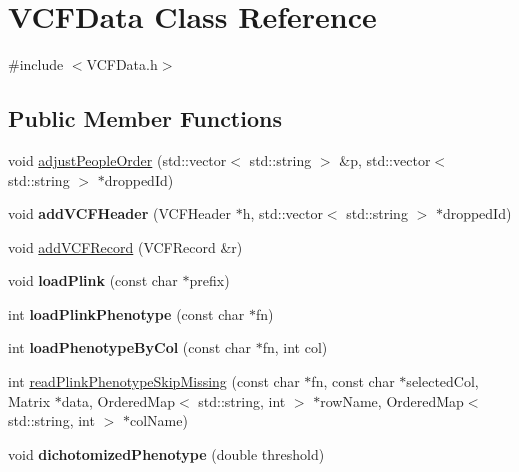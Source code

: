 \hypertarget{classVCFData}{\section{V\-C\-F\-Data Class Reference}
\label{classVCFData}
}


{\ttfamily \#include $<$V\-C\-F\-Data.\-h$>$}

\subsection*{Public Member Functions}
\begin{DoxyCompactItemize}
\item 
void \hyperlink{classVCFData_aa237fc9ab7baada2b1621bd098319c7e}{adjust\-People\-Order} (std\-::vector$<$ std\-::string $>$ \&p, std\-::vector$<$ std\-::string $>$ $\ast$dropped\-Id)
\item 
\hypertarget{classVCFData_a4a54a9919215f4d3ce8e7cafdc8593f4}{void {\bfseries add\-V\-C\-F\-Header} (V\-C\-F\-Header $\ast$h, std\-::vector$<$ std\-::string $>$ $\ast$dropped\-Id)}\label{classVCFData_a4a54a9919215f4d3ce8e7cafdc8593f4}

\item 
void \hyperlink{classVCFData_a5d4d267764c8fd3533242af5e11b32a2}{add\-V\-C\-F\-Record} (V\-C\-F\-Record \&r)
\item 
\hypertarget{classVCFData_a314b2f45dce69ca78a92d22e117a4680}{void {\bfseries load\-Plink} (const char $\ast$prefix)}\label{classVCFData_a314b2f45dce69ca78a92d22e117a4680}

\item 
\hypertarget{classVCFData_ac954c619485c7dde44b1d3b07df4da37}{int {\bfseries load\-Plink\-Phenotype} (const char $\ast$fn)}\label{classVCFData_ac954c619485c7dde44b1d3b07df4da37}

\item 
\hypertarget{classVCFData_afd60d597f9ea5addef895e81122c67e5}{int {\bfseries load\-Phenotype\-By\-Col} (const char $\ast$fn, int col)}\label{classVCFData_afd60d597f9ea5addef895e81122c67e5}

\item 
int \hyperlink{classVCFData_a919196e09bb6f13bcd30a313386747cd}{read\-Plink\-Phenotype\-Skip\-Missing} (const char $\ast$fn, const char $\ast$selected\-Col, Matrix $\ast$data, Ordered\-Map$<$ std\-::string, int $>$ $\ast$row\-Name, Ordered\-Map$<$ std\-::string, int $>$ $\ast$col\-Name)
\item 
\hypertarget{classVCFData_a5f33cfc1d575be6e92b9a3bd888a8057}{void {\bfseries dichotomized\-Phenotype} (double threshold)}\label{classVCFData_a5f33cfc1d575be6e92b9a3bd888a8057}


\end{DoxyCompactItemize}
